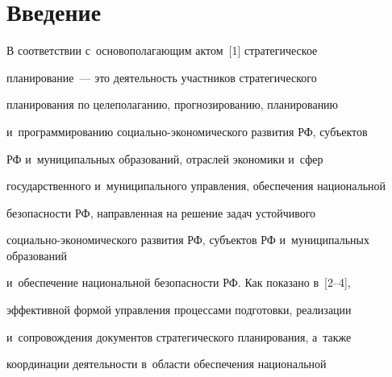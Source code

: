 




















 \thispagestyle{headings}


 


 \vspace*{-12pt} 








\section{Введение}





В соответствии с~основополагающим актом~[1] стратегическое 


планирование~--- это деятельность участников стратегического 


планирования по целеполаганию, прогнозированию, планированию 


и~программированию со\-ци\-аль\-но-эко\-но\-ми\-че\-ско\-го развития РФ, субъектов 


РФ и~муниципальных образований, отраслей экономики и~сфер 


государственного и~муниципального управления, обеспечения национальной 


безопасности РФ, направленная на решение задач устойчивого 


со\-ци\-аль\-но-эко\-но\-ми\-че\-ско\-го развития РФ, субъектов РФ и~муниципальных образований 


и~обеспечение национальной безопасности РФ. Как показано в~[2--4], 


эффективной формой управления процессами подготовки, реализации 


и~сопровождения документов стратегического планирования, а~также 


координации деятельности в~области обеспечения национальной 


